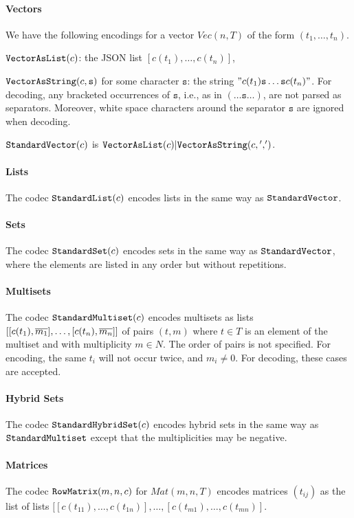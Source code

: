 \paragraph{Vectors}
We have the following encodings for a vector $Vec(n,T)$ of the form $(t_1, \ldots, t_n)$.

$\cn{VectorAsList}(c)$: the JSON list $[c(t_1),\ldots,c(t_n)]$,

$\cn{VectorAsString}(c,\mathtt{s})$ for some character $\mathtt{s}$: the string $"c(t_1)\mathtt{s}\ldots\mathtt{s}c(t_n)"$.
For decoding, any bracketed occurrences of $\mathtt{s}$, i.e., as in  $(\ldots\mathtt{s}\ldots)$, are not parsed as separators.
Moreover, white space characters around the separator $\mathtt{s}$ are ignored when decoding.

$\cn{StandardVector}(c)$ is $\cunion{\cn{VectorAsList}(c), {\cn{VectorAsString}(c,\mathtt{','})}}$.

\paragraph{Lists}
The codec $\cn{StandardList}(c)$ encodes lists in the same way as $\cn{StandardVector}$.

\paragraph{Sets}
The codec $\cn{StandardSet}(c)$ encodes sets in the same way as $\cn{StandardVector}$, where the elements are listed in any order but without repetitions.

\paragraph{Multisets}
The codec $\cn{StandardMultiset}(c)$ encodes multisets as lists $[[c(t_1),\ov{m_1}], \ldots, [c(t_n),\ov{m_n}]]$ of pairs $(t,m)$ where $t\in T$ is an element of the multiset and with multiplicity $m\in N$.
The order of pairs is not specified.
For encoding, the same $t_i$ will not occur twice, and $m_i\neq 0$. For decoding, these cases are accepted.

\paragraph{Hybrid Sets}
The codec $\cn{StandardHybridSet}(c)$ encodes hybrid sets in the same way as $\cn{StandardMultiset}$ except that the multiplicities may be negative.

\paragraph{Matrices}
The codec $\cn{RowMatrix}(m,n,c)$ for $Mat(m,n,T)$ encodes matrices $(t_{ij})$ as the list of lists $[[c(t_{11}),\ldots,c(t_{1n})], \ldots, [c(t_{m1}),\ldots,c(t_{mn})]$.

